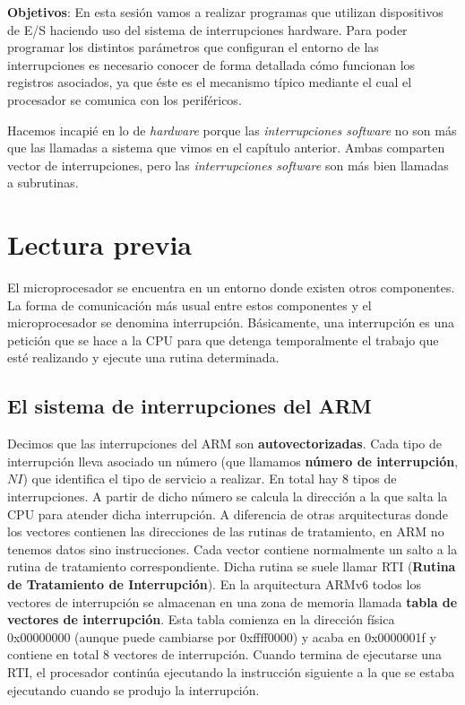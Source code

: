%

\label{chp:Interrupciones}
\minitoc

{\bf Objetivos}: En esta sesión vamos a realizar programas que
utilizan dispositivos de E/S haciendo uso del sistema de
interrupciones hardware. Para poder programar los distintos parámetros
que configuran el entorno de las interrupciones es necesario conocer de
forma detallada cómo funcionan los registros asociados, ya que
éste es el mecanismo típico mediante el cual el procesador se
comunica con los periféricos.

Hacemos incapié en lo de {\it hardware} porque las
{\it interrupciones software} no son más que las llamadas a sistema
que vimos en el capítulo anterior. Ambas comparten vector de interrupciones,
pero las {\it interrupciones software} son más bien llamadas a subrutinas.

\section{Lectura previa}

El microprocesador se encuentra en un entorno donde existen otros
componentes. La forma de comunicación más usual entre estos
componentes y el microprocesador se denomina interrupción.
Básicamente, una interrupción es una petición que se hace a la CPU
para que detenga temporalmente el trabajo que esté realizando y
ejecute una rutina determinada. 

\subsection{El sistema de interrupciones del ARM}

Decimos que las interrupciones del ARM son {\bf autovectorizadas}.
Cada tipo de interrupción lleva asociado un número (que llamamos
{\bf número de interrupción}, $NI$) que identifica el tipo de servicio a
realizar. En total hay 8 tipos de interrupciones.
A partir de dicho número se calcula la dirección a la que salta la CPU
para atender dicha interrupción. A diferencia de otras arquitecturas
donde los vectores contienen las direcciones de las rutinas de
tratamiento, en ARM no tenemos datos sino instrucciones. Cada vector
contiene normalmente un salto a la rutina de tratamiento correspondiente.
Dicha rutina se suele llamar RTI ({\bf Rutina
de Tratamiento de Interrupción}). En la arquitectura ARMv6
todos los vectores de interrupción se almacenan en una zona de memoria
llamada {\bf tabla de vectores de interrupción}. Esta tabla comienza
en la dirección física 0x00000000 (aunque puede cambiarse por
0xffff0000) y acaba en 0x0000001f y contiene en total 8 vectores de
interrupción. Cuando termina de ejecutarse una RTI,
el procesador continúa ejecutando la instrucción siguiente a la que se
estaba ejecutando cuando se produjo la interrupción.

